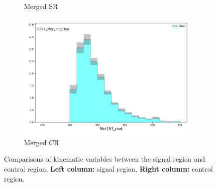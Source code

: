 \begin{figure}[htbp]
\begin{subfigure}{0.49\textwidth}
    \caption{Merged SR \met}
    \end{subfigure}
    \begin{subfigure}{0.49\textwidth}
    \includegraphics[width = 0.98\textwidth]{Figures/4/CRSR/CR1L_Merged_ttbar/MetTST_met.png}
    \caption{Merged CR \met}
    \end{subfigure}


     \caption{Comparisons of kinematic variables between the \merged signal region and \ttbar control region. \textbf{Left column:} signal region, \textbf{Right column:} control region.}
     \label{fig:CRSR_merged}
  \end{figure}

